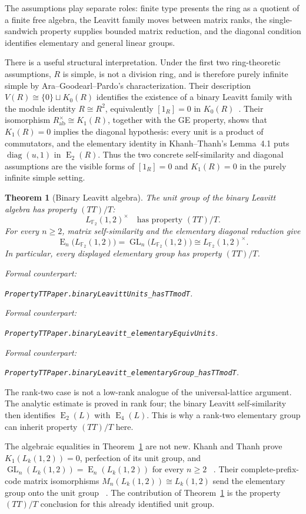\documentclass[11pt]{amsart}
\newif\ifanonymous\anonymoustrue
\newcommand{\leanrepo}{[repository link removed for anonymous review]}
\newcommand{\leanrepo}{https://github.com/SauersML/group-approximation}
\newcommand{\leanverified}[2]{%
  \par\smallskip\noindent
  {\normalfont\footnotesize\color{gray!70!black}%
  Formal counterpart:\par\nobreak\noindent
  \ifanonymous\nolinkurl{#2}\else
  \href{\leanrepo/blob/main/GroupApproximation/#1.lean}{\nolinkurl{#2}}\fi.}}
\theoremstyle{definition}
\theoremstyle{plain}
\newtheorem{mainthm}{Theorem}
\newcommand{\F}{\mathbb F}
\newcommand{\GL}{\operatorname{GL}}
\newcommand{\EL}{\operatorname{E}}
\newcommand{\diag}{\operatorname{diag}}
\begin{document}
The assumptions play separate roles: finite type presents the
ring as a quotient of a finite free algebra, the Leavitt family moves
between matrix ranks, the single-sandwich property supplies bounded
matrix reduction, and the diagonal condition identifies elementary
and general linear groups.

There is a useful structural interpretation.  Under the first two
ring-theoretic assumptions, \(R\) is simple, is not a division ring,
and is therefore purely infinite simple by
Ara--Goodearl--Pardo's characterization.  Their description
\(V(R)\cong\{0\}\sqcup K_0(R)\) identifies the existence of a binary
Leavitt family with the module identity \(R\cong R^2\), equivalently
\([1_R]=0\) in \(K_0(R)\)~\cite{AraGoodearlPardo}.  Their isomorphism
\(R^\times_{\mathrm{ab}}\cong K_1(R)\), together with the GE property,
shows that \(K_1(R)=0\) implies the diagonal hypothesis: every unit is
a product of commutators, and the elementary identity in
Khanh--Thanh's Lemma~4.1 puts
\(\diag(u,1)\) in \(\EL_2(R)\).  Thus the two concrete
self-similarity and diagonal assumptions are the visible forms of
\([1_R]=0\) and \(K_1(R)=0\) in the purely infinite simple setting.

\begin{mainthm}[Binary Leavitt algebra]\label{thm:C}
The unit group of the binary Leavitt algebra has property \((TT)/T\):
\[
  L_{\F_2}(1,2)^\times
  \quad\text{has property }(TT)/T.
\]
For every \(n\ge2\), matrix self-similarity and the elementary
diagonal reduction give
\[
 \EL_n\bigl(L_{\F_2}(1,2)\bigr)
 =\GL_n\bigl(L_{\F_2}(1,2)\bigr)
 \cong L_{\F_2}(1,2)^\times.
\]
In particular, every displayed elementary group has property
\((TT)/T\).
\leanverified{PropertyTT/PaperStatements}{PropertyTTPaper.binaryLeavittUnits_hasTTmodT}
\leanverified{PropertyTT/PaperStatements}{PropertyTTPaper.binaryLeavitt_elementaryEquivUnits}
\leanverified{PropertyTT/PaperStatements}{PropertyTTPaper.binaryLeavitt_elementaryGroup_hasTTmodT}
\end{mainthm}

The rank-two case is not a low-rank analogue of the universal-lattice
argument.  The analytic estimate is proved in rank four; the binary
Leavitt self-similarity then identifies \(\EL_2(L)\) with
\(\EL_4(L)\).  This is why a rank-two elementary group can inherit
property \((TT)/T\) here.

The algebraic equalities in Theorem~\ref{thm:C} are not new.
Khanh and Thanh prove \(K_1(L_k(1,2))=0\), perfection of its unit
group, and
\(\GL_n(L_k(1,2))=\EL_n(L_k(1,2))\) for every \(n\ge2\)
~\cite[Proposition~4.2]{KhanhThanh}.  Their complete-prefix-code
matrix isomorphisms \(M_n(L_k(1,2))\cong L_k(1,2)\) send the
elementary group onto the unit group
~\cite[Corollary~4.4]{KhanhThanh}.  The contribution of
Theorem~\ref{thm:C} is the property \((TT)/T\) conclusion for this
already identified unit group.
\end{document}
